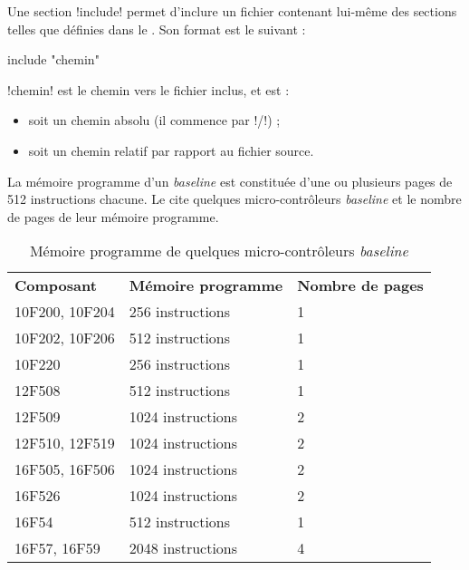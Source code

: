 
Une section \pic!include! permet d'inclure un fichier contenant lui-même des sections telles que définies dans le .  Son format est le suivant :

\begin{piccolo}
  include "chemin"
\end{piccolo}

\pic!chemin! est le chemin vers le fichier inclus, et est :
\begin{itemize}
  \item soit un chemin absolu (il commence par \pic!/!) ;
  \item soit un chemin relatif par rapport au fichier source.
\end{itemize}


La mémoire programme d'un \emph{baseline} est constituée d'une ou plusieurs pages de 512 instructions chacune. Le  cite quelques micro-contrôleurs \emph{baseline} et le nombre de pages de leur mémoire programme.

\begin{table}[htbp]
  \centering
  \small
  \fondTableau
  \begin{tabular}{lll}
    \textbf{Composant} & \textbf{Mémoire programme} & \textbf{Nombre de pages}\\
    10F200, 10F204  & 256 instructions & 1\\
    \hdashline
    10F202, 10F206  & 512 instructions & 1\\
    \hdashline
    10F220  & 256 instructions & 1\\
    \hdashline
    12F508  & 512 instructions & 1\\
    \hdashline
    12F509  & 1024 instructions & 2\\
    \hdashline
    12F510, 12F519  & 1024 instructions & 2\\
    \hdashline
    16F505, 16F506  & 1024 instructions & 2\\
    \hdashline
    16F526 & 1024 instructions & 2\\
    \hdashline
    16F54  & 512 instructions & 1\\
    \hdashline
    16F57, 16F59  & 2048 instructions & 4\\
  \end{tabular}
  \caption{Mémoire programme de quelques micro-contrôleurs \emph{baseline}}
  \ligne
\end{table}

